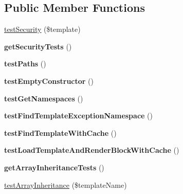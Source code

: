 \subsection*{Public Member Functions}
\begin{DoxyCompactItemize}
\item 
\hyperlink{classTwig__Tests__Loader__FilesystemTest_a756c302bb1a43b59cdae18d8a4c0d465}{test\+Security} (\$template)
\item 
{\bfseries get\+Security\+Tests} ()\hypertarget{classTwig__Tests__Loader__FilesystemTest_ad6774f724c4b324a3d35c3ce79d0079f}{}\label{classTwig__Tests__Loader__FilesystemTest_ad6774f724c4b324a3d35c3ce79d0079f}

\item 
{\bfseries test\+Paths} ()\hypertarget{classTwig__Tests__Loader__FilesystemTest_a67fe3fce5b4527cd570092c6413f9890}{}\label{classTwig__Tests__Loader__FilesystemTest_a67fe3fce5b4527cd570092c6413f9890}

\item 
{\bfseries test\+Empty\+Constructor} ()\hypertarget{classTwig__Tests__Loader__FilesystemTest_a6e1bbf2e147fa414e559e973e2e1ce80}{}\label{classTwig__Tests__Loader__FilesystemTest_a6e1bbf2e147fa414e559e973e2e1ce80}

\item 
{\bfseries test\+Get\+Namespaces} ()\hypertarget{classTwig__Tests__Loader__FilesystemTest_af17b091a524e745b76337593c7ddcc3b}{}\label{classTwig__Tests__Loader__FilesystemTest_af17b091a524e745b76337593c7ddcc3b}

\item 
{\bfseries test\+Find\+Template\+Exception\+Namespace} ()\hypertarget{classTwig__Tests__Loader__FilesystemTest_ad675a41e8a7eecf895835b6ca760504e}{}\label{classTwig__Tests__Loader__FilesystemTest_ad675a41e8a7eecf895835b6ca760504e}

\item 
{\bfseries test\+Find\+Template\+With\+Cache} ()\hypertarget{classTwig__Tests__Loader__FilesystemTest_a7730b4417f962beb0288fda102871f1b}{}\label{classTwig__Tests__Loader__FilesystemTest_a7730b4417f962beb0288fda102871f1b}

\item 
{\bfseries test\+Load\+Template\+And\+Render\+Block\+With\+Cache} ()\hypertarget{classTwig__Tests__Loader__FilesystemTest_a19f0fa2522587983a0111b9359ef3094}{}\label{classTwig__Tests__Loader__FilesystemTest_a19f0fa2522587983a0111b9359ef3094}

\item 
{\bfseries get\+Array\+Inheritance\+Tests} ()\hypertarget{classTwig__Tests__Loader__FilesystemTest_a1017e3a61c78408305e8c8690ce3a19f}{}\label{classTwig__Tests__Loader__FilesystemTest_a1017e3a61c78408305e8c8690ce3a19f}

\item 
\hyperlink{classTwig__Tests__Loader__FilesystemTest_a6412316fe0634201fb88639f2c6f38f6}{test\+Array\+Inheritance} (\$template\+Name)
\end{DoxyCompactItemize}


